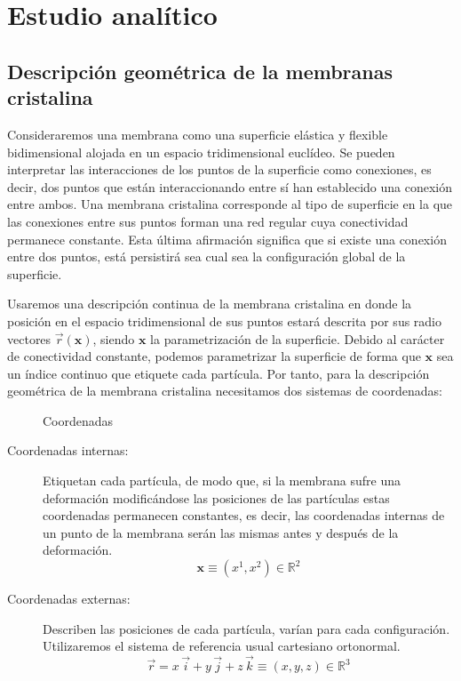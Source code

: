 
\chapter{Estudio analítico}

\section{Descripción geométrica de la membranas cristalina}

Consideraremos una membrana como una superficie elástica y flexible 
bidimensional alojada en un espacio tridimensional euclídeo. 
Se pueden interpretar las interacciones de los puntos de la superficie como
conexiones, es decir, dos puntos que están interaccionando entre sí han
establecido una conexión entre ambos. Una membrana cristalina corresponde al
tipo de superficie en la que las conexiones entre sus puntos forman una red
regular cuya conectividad permanece constante. Esta última afirmación
significa que si existe una conexión entre dos puntos, está persistirá sea
cual sea la configuración global de la superficie.

Usaremos una descripción continua de la membrana cristalina en donde la
posición en el espacio tridimensional de sus puntos estará descrita por sus
radio vectores $\vec{r}(\mathbf{x})$, siendo $\mathbf{x}$ la parametrización
de la superficie. Debido al carácter de conectividad constante, podemos
parametrizar la superficie de forma que $\mathbf{x}$ sea un índice continuo
que etiquete cada partícula. Por tanto, para la descripción geométrica de la
membrana cristalina necesitamos dos sistemas de coordenadas:

\begin{figure}[h]
\centering
{}
\quad
{}
\caption{Coordenadas }
\end{figure}

\begin{description}
\item[Coordenadas internas:] Etiquetan cada partícula, de modo que, si la
  membrana sufre una deformación modificándose las posiciones de las
  partículas estas coordenadas permanecen constantes, es decir, las
  coordenadas internas de un punto de la membrana serán las mismas antes y
  después de la deformación. 
  \begin{equation*}
  \mathbf{x}\equiv (x^1,x^2)\in \mathbb{R}^2
  \end{equation*}
\item[Coordenadas externas:] Describen las posiciones de cada partícula,
  varían para cada configuración. Utilizaremos el sistema de referencia usual
  cartesiano ortonormal.
  \begin{equation*}
    \vec{r}=x\,\vec{i}+y\,\vec{j}+z\,\vec{k}\equiv (x,y,z)\in \mathbb{R}^3
  \end{equation*}
\end{description}

